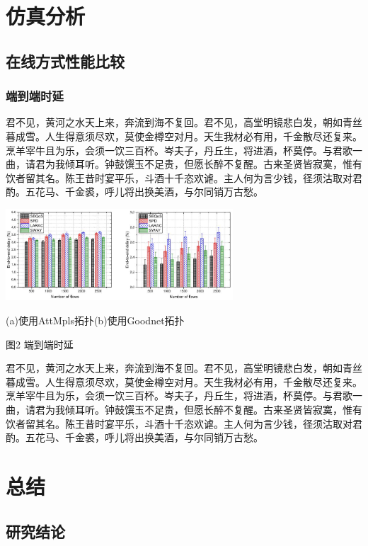 \documentclass[a4paper, UTF8]{ctexart}
\makeatletter
\newenvironment{figurehere} 
{\def\@captype{figure}}
\makeatother
\begin{document}
\begin{multicols}{2}
	
	\section{仿真分析}%
	
	\subsection{在线方式性能比较}%
	
	\subsubsection{端到端时延}%
	
	君不见，黄河之水天上来，奔流到海不复回。君不见，高堂明镜悲白发，朝如青丝暮成雪。人生得意须尽欢，莫使金樽空对月。天生我材必有用，千金散尽还复来。烹羊宰牛且为乐，会须一饮三百杯。岑夫子，丹丘生，将进酒，杯莫停。与君歌一曲，请君为我倾耳听。钟鼓馔玉不足贵，但愿长醉不复醒。古来圣贤皆寂寞，惟有饮者留其名。陈王昔时宴平乐，斗酒十千恣欢谑。主人何为言少钱，径须沽取对君酌。五花马、千金裘，呼儿将出换美酒，与尔同销万古愁。
	
	\begin{figurehere}  
		\centering
		\includegraphics[width=8.5cm]{3.jpg}
		\label{3}
		\\\centerline{(a)使用AttMpls拓扑\quad(b)使用Goodnet拓扑}
		\centerline{图2 端到端时延\cite{ref1}}
	\end{figurehere}
	
	君不见，黄河之水天上来，奔流到海不复回。君不见，高堂明镜悲白发，朝如青丝暮成雪。人生得意须尽欢，莫使金樽空对月。天生我材必有用，千金散尽还复来。烹羊宰牛且为乐，会须一饮三百杯。岑夫子，丹丘生，将进酒，杯莫停。与君歌一曲，请君为我倾耳听。钟鼓馔玉不足贵，但愿长醉不复醒。古来圣贤皆寂寞，惟有饮者留其名。陈王昔时宴平乐，斗酒十千恣欢谑。主人何为言少钱，径须沽取对君酌。五花马、千金裘，呼儿将出换美酒，与尔同销万古愁。
	
	
	\section{总结}%
	
	\subsection{研究结论}%
	

\end{multicols}
\end{document}
